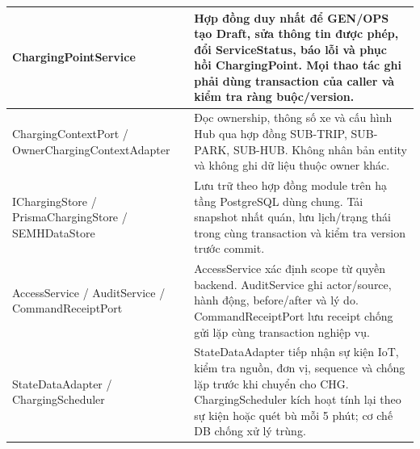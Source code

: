 \begin{longtable}{|L{37mm}|L{102mm}|}
Charging\allowbreak Point\allowbreak Service & Hợp đồng duy nhất để GEN/OPS tạo Draft, sửa thông tin được phép, đổi ServiceStatus, báo lỗi và phục hồi ChargingPoint. Mọi thao tác ghi phải dùng transaction của caller và kiểm tra ràng buộc/version.\\\hline
Charging\allowbreak Context\allowbreak Port / Owner\allowbreak Charging\allowbreak Context\allowbreak Adapter & Đọc ownership, thông số xe và cấu hình Hub qua hợp đồng SUB-TRIP, SUB-PARK, SUB-HUB. Không nhân bản entity và không ghi dữ liệu thuộc owner khác.\\\hline
IChargingStore / Prisma\allowbreak Charging\allowbreak Store / SEMHDataStore & Lưu trữ theo hợp đồng module trên hạ tầng PostgreSQL dùng chung. Tải snapshot nhất quán, lưu lịch/trạng thái trong cùng transaction và kiểm tra version trước commit.\\\hline
AccessService / AuditService / Command\allowbreak Receipt\allowbreak Port & AccessService xác định scope từ quyền backend. AuditService ghi actor/source, hành động, before/after và lý do. Command\allowbreak Receipt\allowbreak Port lưu receipt chống gửi lặp cùng transaction nghiệp vụ.\\\hline
StateDataAdapter / ChargingScheduler & StateDataAdapter tiếp nhận sự kiện IoT, kiểm tra nguồn, đơn vị, sequence và chống lặp trước khi chuyển cho CHG. ChargingScheduler kích hoạt tính lại theo sự kiện hoặc quét bù mỗi 5 phút; cơ chế DB chống xử lý trùng.\\\hline
\end{longtable}

